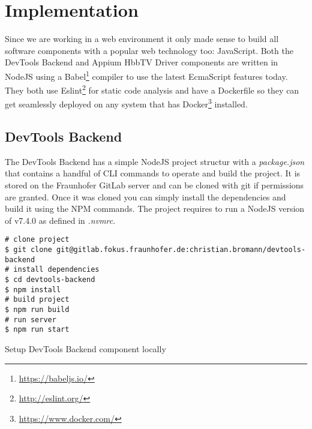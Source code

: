 %

\chapter{Implementation\label{cha:implementation}}

Since we are working in a web environment it only made sense to build all software components with a
popular web technology too: JavaScript. Both the DevTools Backend and Appium HbbTV Driver components
are written in NodeJS using a Babel\footnote{\url{https://babeljs.io/}} compiler to use the latest
EcmaScript features today. They both use Eslint\footnote{\url{http://eslint.org/}} for static code
analysis and have a Dockerfile so they can get seamlessly deployed on any system that has Docker\footnote{\url{https://www.docker.com/}}
installed.

\section{DevTools Backend\label{sec:implDevtoolsBackend}}

The DevTools Backend has a simple NodeJS project structur with a \textit{package.json} that contains
a handful of CLI commands to operate and build the project. It is stored on the Fraunhofer GitLab
server and can be cloned with git if permissions are granted. Once it was cloned you can simply install
the dependencies and build it using the NPM commands. The project requires to run a NodeJS version
of v7.4.0 as defined in \textit{.nvmrc}.

\vspace{1cm}
\begin{listing}[H]
\begin{verbatim}
# clone project
$ git clone git@gitlab.fokus.fraunhofer.de:christian.bromann/devtools-backend
# install dependencies
$ cd devtools-backend
$ npm install
# build project
$ npm run build
# run server
$ npm run start
\end{verbatim}
\caption{Setup DevTools Backend component locally}
\label{lst:setupdevtools}
\end{listing}
\vspace{0.5cm}

